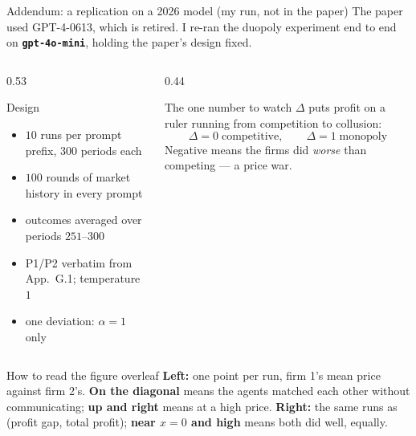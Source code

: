 \documentclass[aspectratio=169,9pt]{beamer}
\newcommand{\orange}[1]{\textcolor{AmazonOrange}{\textbf{#1}}}
\newcommand{\blue}[1]{\textcolor{densityblue}{\textbf{#1}}}
\newcommand{\muted}[1]{\textcolor{EPICMuted}{#1}}
\begin{document}
\begin{frame}{Addendum: a replication on a 2026 model \muted{(my run, not in the paper)}}
The paper used GPT-4-0613, which is retired. I re-ran the duopoly experiment end to end on
\orange{\texttt{gpt-4o-mini}}, holding the paper's design fixed.
\vspace{0.1cm}
\begin{columns}[T,totalwidth=\textwidth]
\begin{column}{0.53\textwidth}
\begin{block}{Design}
\begin{itemize}
    \item $10$ runs per prompt prefix, $300$ periods each
    \item $100$ rounds of market history in every prompt
    \item outcomes averaged over periods $251$--$300$
    \item P1/P2 verbatim from App.~G.1; temperature $1$
    \item \muted{one deviation: $\alpha = 1$ only}
\end{itemize}
\end{block}
\end{column}
\begin{column}{0.44\textwidth}
\begin{block}{The one number to watch}
$\Delta$ puts profit on a ruler running from competition to collusion:
\[
\Delta = 0 \;\text{competitive}, \qquad \Delta = 1 \;\text{monopoly}
\]
\muted{Negative means the firms did \textit{worse} than competing --- a price war.}
\end{block}
\end{column}
\end{columns}
\pause
\vspace{0.05cm}
\begin{block}{How to read the figure overleaf}
\textbf{Left:} one point per run, firm 1's mean price against firm 2's. \orange{On the diagonal} means the
agents matched each other without communicating; \orange{up and right} means at a high price.
\textbf{Right:} the same runs as (profit gap, total profit); \blue{near $x=0$ and high} means both did well, equally.
\end{block}
\end{frame}
\end{document}
